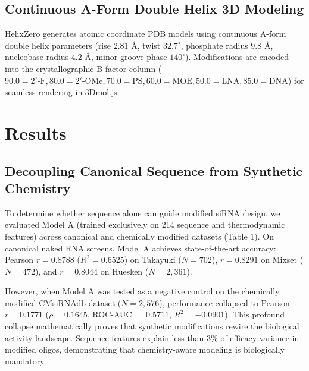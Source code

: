 \documentclass[twocolumn]{article}
\begin{document}
\subsection{Continuous A-Form Double Helix 3D Modeling}
HelixZero generates atomic coordinate PDB models using continuous A-form double helix parameters (rise $2.81\text{ \AA}$, twist $32.7^\circ$, phosphate radius $9.8\text{ \AA}$, nucleobase radius $4.2\text{ \AA}$, minor groove phase $140^\circ$). Modifications are encoded into the crystallographic B-factor column ($90.0=2'\text{-F}, 80.0=2'\text{-OMe}, 70.0=\text{PS}, 60.0=\text{MOE}, 50.0=\text{LNA}, 85.0=\text{DNA}$) for seamless rendering in 3Dmol.js.

\section{Results}

\subsection{Decoupling Canonical Sequence from Synthetic Chemistry}
To determine whether sequence alone can guide modified siRNA design, we evaluated Model A (trained exclusively on 214 sequence and thermodynamic features) across canonical and chemically modified datasets (Table 1). On canonical naked RNA screens, Model A achieves state-of-the-art accuracy: Pearson $r = 0.8788$ ($R^2 = 0.6525$) on Takayuki ($N=702$), $r = 0.8291$ on Mixset ($N=472$), and $r = 0.8044$ on Huesken ($N=2{,}361$).

However, when Model A was tested as a negative control on the chemically modified CMsiRNAdb dataset ($N = 2{,}576$), performance collapsed to Pearson $r = 0.1771$ ($\rho = 0.1645$, ROC-AUC $= 0.5711$, $R^2 = -0.0901$). This profound collapse mathematically proves that synthetic modifications rewire the biological activity landscape. Sequence features explain less than 3\% of efficacy variance in modified oligos, demonstrating that chemistry-aware modeling is biologically mandatory.
\end{document}
